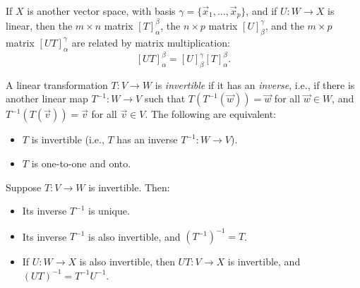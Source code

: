\begin{fact}
	If $X$ is another vector space, with basis $\gamma = \{\vec{x}_1, \dots,
	\vec{x}_p\}$, and if $U : W \rightarrow X$ is linear, then the $m \times n$
	matrix ${[T]}_\alpha^\beta$, the $n \times p$ matrix ${[U]}_\beta^\gamma$, and
	the $m \times p$ matrix ${[UT]}_\alpha^\gamma$ are related by matrix
	multiplication:
	\[
		{[UT]}_\alpha^\beta = {[U]}_\beta^\gamma {[T]}_\alpha^\beta.
	\]
\end{fact}

\begin{definition}
	A linear transformation $T : V \rightarrow W$ is \emph{invertible} if it has
	an \emph{inverse}, i.e., if there is another linear map $T^{-1} : W
	\rightarrow V$ such that $T(T^{-1}(\vec{w})) = \vec{w}$ for all $\vec{w} \in
	W$, and $T^{-1}(T(\vec{v})) = \vec{v}$ for all $\vec{v} \in V$. The following
	are equivalent:
	\begin{itemize}
		\item $T$ is invertible (i.e., $T$ has an inverse $T^{-1} : W \rightarrow
			V$).
		\item $T$ is one-to-one and onto.
	\end{itemize}
\end{definition}

\begin{facts}
	Suppose $T: V \rightarrow W$ is invertible. Then:
	\begin{itemize}
		\item Its inverse $T^{-1}$ is unique.
		\item Its inverse $T^{-1}$ is also invertible, and ${(T^{-1})}^{-1} = T$.
		\item If $U : W \rightarrow X$ is also invertible, then $UT : V \rightarrow
			X$ is invertible, and ${(UT)}^{-1} = T^{-1} U^{-1}$.
	\end{itemize}
\end{facts}

